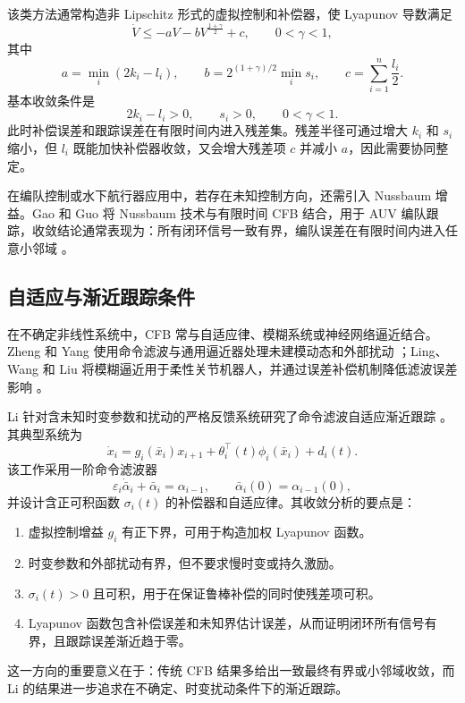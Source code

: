 \documentclass[UTF8,a4paper,11pt,fontset=fandol]{ctexart}
\begin{document}
该类方法通常构造非 Lipschitz 形式的虚拟控制和补偿器，使 Lyapunov 导数满足
\begin{equation}
  \dot{V}\le -aV-bV^{\frac{1+\gamma}{2}}+c,\qquad 0<\gamma<1 ,
\end{equation}
其中
\begin{equation}
  a=\min_i(2k_i-l_i),\qquad
  b=2^{(1+\gamma)/2}\min_i s_i,\qquad
  c=\sum_{i=1}^{n}\frac{l_i}{2}.
\end{equation}
基本收敛条件是
\begin{equation}
  2k_i-l_i>0,\qquad s_i>0,\qquad 0<\gamma<1 .
\end{equation}
此时补偿误差和跟踪误差在有限时间内进入残差集。残差半径可通过增大 $k_i$ 和 $s_i$ 缩小，但 $l_i$ 既能加快补偿器收敛，又会增大残差项 $c$ 并减小 $a$，因此需要协同整定。

在编队控制或水下航行器应用中，若存在未知控制方向，还需引入 Nussbaum 增益。Gao 和 Guo 将 Nussbaum 技术与有限时间 CFB 结合，用于 AUV 编队跟踪，收敛结论通常表现为：所有闭环信号一致有界，编队误差在有限时间内进入任意小邻域 \cite{Gao2020AUV}。

\subsection{自适应与渐近跟踪条件}

在不确定非线性系统中，CFB 常与自适应律、模糊系统或神经网络逼近结合。Zheng 和 Yang 使用命令滤波与通用逼近器处理未建模动态和外部扰动 \cite{Zheng2020Universal}；Ling、Wang 和 Liu 将模糊逼近用于柔性关节机器人，并通过误差补偿机制降低滤波误差影响 \cite{Ling2020Fuzzy}。

Li 针对含未知时变参数和扰动的严格反馈系统研究了命令滤波自适应渐近跟踪 \cite{Li2022Asymptotic}。其典型系统为
\begin{equation}
  \dot{x}_i=g_i(\bar{x}_i)x_{i+1}+\theta_i^\top(t)\phi_i(\bar{x}_i)+d_i(t).
\end{equation}
该工作采用一阶命令滤波器
\begin{equation}
  \varepsilon_i\dot{\bar{\alpha}}_i+\bar{\alpha}_i=\alpha_{i-1},\qquad
  \bar{\alpha}_i(0)=\alpha_{i-1}(0),
\end{equation}
并设计含正可积函数 $\sigma_i(t)$ 的补偿器和自适应律。其收敛分析的要点是：
\begin{enumerate}
  \item 虚拟控制增益 $g_i$ 有正下界，可用于构造加权 Lyapunov 函数。
  \item 时变参数和外部扰动有界，但不要求慢时变或持久激励。
  \item $\sigma_i(t)>0$ 且可积，用于在保证鲁棒补偿的同时使残差项可积。
  \item Lyapunov 函数包含补偿误差和未知界估计误差，从而证明闭环所有信号有界，且跟踪误差渐近趋于零。
\end{enumerate}
这一方向的重要意义在于：传统 CFB 结果多给出一致最终有界或小邻域收敛，而 Li 的结果进一步追求在不确定、时变扰动条件下的渐近跟踪。
\end{document}
